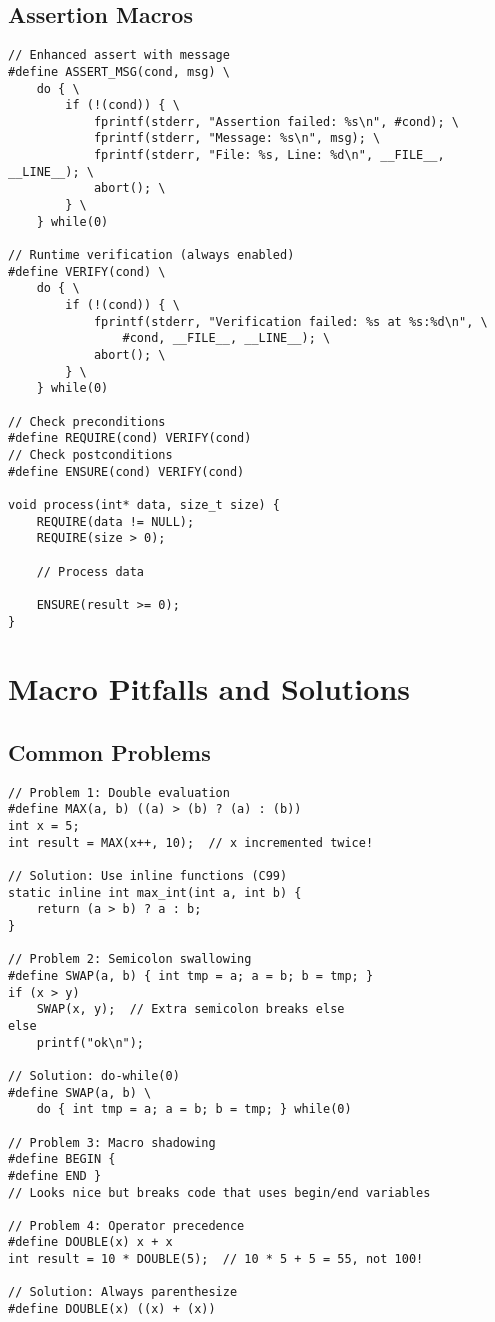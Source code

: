 \subsection{Assertion Macros}

\begin{lstlisting}
// Enhanced assert with message
#define ASSERT_MSG(cond, msg) \
    do { \
        if (!(cond)) { \
            fprintf(stderr, "Assertion failed: %s\n", #cond); \
            fprintf(stderr, "Message: %s\n", msg); \
            fprintf(stderr, "File: %s, Line: %d\n", __FILE__, __LINE__); \
            abort(); \
        } \
    } while(0)

// Runtime verification (always enabled)
#define VERIFY(cond) \
    do { \
        if (!(cond)) { \
            fprintf(stderr, "Verification failed: %s at %s:%d\n", \
                #cond, __FILE__, __LINE__); \
            abort(); \
        } \
    } while(0)

// Check preconditions
#define REQUIRE(cond) VERIFY(cond)
// Check postconditions
#define ENSURE(cond) VERIFY(cond)

void process(int* data, size_t size) {
    REQUIRE(data != NULL);
    REQUIRE(size > 0);

    // Process data

    ENSURE(result >= 0);
}
\end{lstlisting}

\section{Macro Pitfalls and Solutions}

\subsection{Common Problems}

\begin{lstlisting}
// Problem 1: Double evaluation
#define MAX(a, b) ((a) > (b) ? (a) : (b))
int x = 5;
int result = MAX(x++, 10);  // x incremented twice!

// Solution: Use inline functions (C99)
static inline int max_int(int a, int b) {
    return (a > b) ? a : b;
}

// Problem 2: Semicolon swallowing
#define SWAP(a, b) { int tmp = a; a = b; b = tmp; }
if (x > y)
    SWAP(x, y);  // Extra semicolon breaks else
else
    printf("ok\n");

// Solution: do-while(0)
#define SWAP(a, b) \
    do { int tmp = a; a = b; b = tmp; } while(0)

// Problem 3: Macro shadowing
#define BEGIN {
#define END }
// Looks nice but breaks code that uses begin/end variables

// Problem 4: Operator precedence
#define DOUBLE(x) x + x
int result = 10 * DOUBLE(5);  // 10 * 5 + 5 = 55, not 100!

// Solution: Always parenthesize
#define DOUBLE(x) ((x) + (x))
\end{lstlisting}

